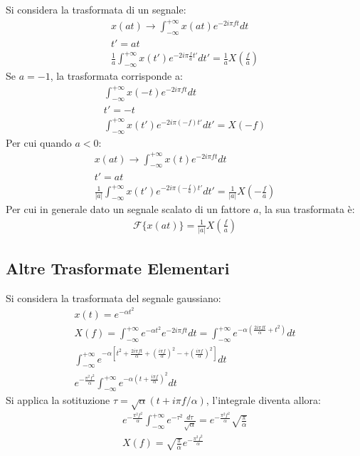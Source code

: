 \documentclass{article}
\numberwithin{equation}{subsection}
\begin{document}
Si considera la trasformata di un segnale:
\begin{gather*}
    x(at)\to\displaystyle\int_{-\infty}^{+\infty}x(at)e^{-2i\pi ft}dt\\
    t'=at\\
    \displaystyle\frac{1}{a}\int_{-\infty}^{+\infty}x(t')e^{-2i\pi \frac{f}{a}t'}dt'=\frac{1}{a}X\left(\frac{f}{a}\right)
\end{gather*}
Se $a=-1$, la trasformata corrisponde a:
\begin{gather*}
    \displaystyle\int_{-\infty}^{+\infty}x(-t)e^{-2i\pi ft}dt\\
    t'=-t\\
    \displaystyle\int_{-\infty}^{+\infty}x(t')e^{-2i\pi(- f)t'}dt'=X(-f)
\end{gather*}
Per cui quando $a<0$:
\begin{gather*}
    x(at)\to\displaystyle\int_{-\infty}^{+\infty}x(t)e^{-2i\pi ft}dt\\
    t'=at\\
    \displaystyle\frac{1}{|a|}\int_{-\infty}^{+\infty}x(t')e^{-2i\pi \left(-\frac{f}{a}\right)t'}dt'=\frac{1}{|a|}X\left(-\frac{f}{a}\right)
\end{gather*}
Per cui in generale dato un segnale scalato di un fattore $a$, la sua trasformata è:
\begin{gather*}
    \mathscr{F}\{x(at)\}=\displaystyle\frac{1}{|a|}X\left(\frac{f}{a}\right)
\end{gather*}

\subsection{Altre Trasformate Elementari}

Si considera la trasformata del segnale gaussiano:
\begin{gather*}
    x(t)=e^{-\alpha t^2}\\
    X(f)=\displaystyle\int_{-\infty}^{+\infty}e^{-\alpha t^2}e^{-2i\pi ft}dt=\int_{-\infty}^{+\infty}e^{-\alpha\left(\frac{2i\pi ft}{\alpha} + t^2\right)}dt\\
    \displaystyle\int_{-\infty}^{+\infty}e^{-\alpha\left[t^2+\frac{2i\pi ft}{\alpha}+\left(\frac{i\pi f}{\alpha}\right)^2-+\left(\frac{i\pi f}{\alpha}\right)^2\right]}dt\\
    e^{-\frac{\pi^2f^2}{\alpha}}\displaystyle\int_{-\infty}^{+\infty}e^{-\alpha\left(t+\frac{i\pi f}{\alpha}\right)^2}dt
\end{gather*}
Si applica la sotituzione $\tau=\sqrt{\alpha}(t+i\pi f/\alpha)$, l'integrale diventa allora:
\begin{gather*}
    e^{-\frac{\pi^2f^2}{\alpha}}\displaystyle\int_{-\infty}^{+\infty}e^{-\tau^2}\frac{d\tau}{\sqrt{\alpha}}=e^{-\frac{\pi^2f^2}{\alpha}}\sqrt{\frac{\pi}{\alpha}}\\
    X(f)=\sqrt{\frac{\pi}{\alpha}}e^{-\frac{\pi^2f^2}{\alpha}}
\end{gather*}
\end{document}
